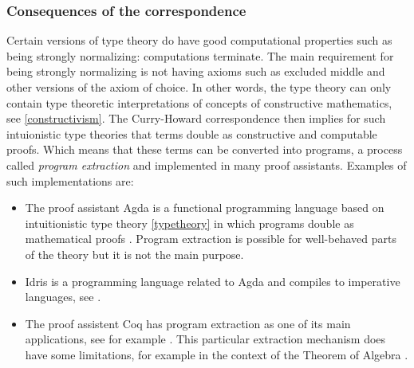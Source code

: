 \documentclass[12pt,a4paper,twoside,xetex]{book}
\newcommand{\keyword}[1]{\emph{#1}\index{#1}}
\begin{document}
\subsubsection{Consequences of the correspondence}

Certain versions of type theory do have good computational properties such as being strongly normalizing: computations terminate. The main requirement for being strongly normalizing is not having axioms such as excluded middle and other versions of the axiom of choice. In other words, the type theory can only contain type theoretic interpretations of concepts of constructive mathematics, see \cref{constructivism}. The Curry-Howard correspondence then implies for such intuionistic type theories that terms double as constructive and computable proofs. Which means that these terms can be converted into programs, a process called \keyword{program extraction} and implemented in many proof assistants. Examples of such implementations are:
\begin{itemize}
\item The proof assistant Agda is a functional programming language based on intuitionistic type theory \cref{typetheory} in which programs double as mathematical proofs \cite{Abel2019}. Program extraction is possible for well-behaved parts of the theory but it is not the main purpose.
\item Idris is a programming language related to Agda and compiles to imperative languages, see \cite{Brady2018}.
\item   The proof assistent Coq \cite{Arias2019} has program extraction as one of its main applications, see for example \cite{Pit-Claudel2018}. This particular extraction mechanism does have some limitations, for example in the context of the Theorem of Algebra \cite{Cruz-Filipe2005}. %
\end{itemize}

%

\end{document}
